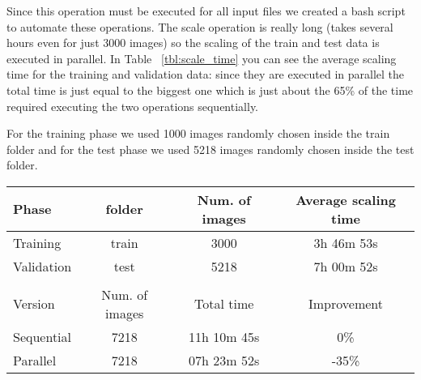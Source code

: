 Since this operation must be executed for all input files we created a bash script to automate these operations. The scale operation is really long (takes several hours even for just 3000 images) so the scaling of the train and test data is executed in parallel. In Table ~\ref{tbl:scale_time} you can see the average scaling time for the training and validation data: since they are executed in parallel the total time is just equal to the biggest one which is just about the 65\% of the time required executing the two operations sequentially.

For the training phase we used 1000 images randomly chosen inside the train folder and for the test phase we used 5218 images randomly chosen inside the test folder.

\begin{table*}[htbp]
\caption{Scaling time}
\centering
\begin{tabular}{lccc}
    Phase  & folder & Num. of images & Average scaling time \\
    \midrule
    Training & train & 3000 & 3h 46m 53s \\
    Validation & test & 5218 & 7h 00m 52s \\
    \\
    Version & Num. of images & Total time & Improvement \\
    \midrule
    Sequential & 7218 & 11h 10m 45s & 0\% \\
    Parallel & 7218 & 07h 23m 52s & -35\% \\
\end{tabular}
\label{tbl:scale_time}
\end{table*}


